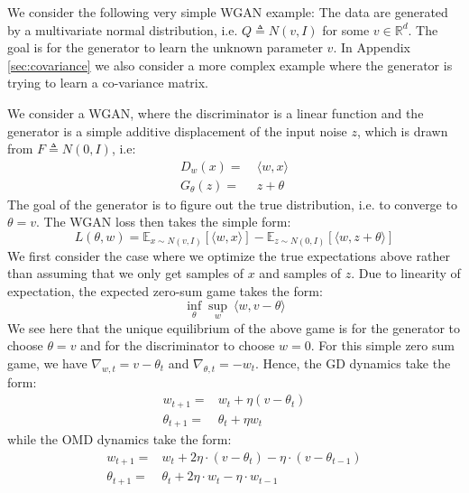 
We consider the following very simple WGAN example: The data are generated by a multivariate normal distribution, i.e. $Q \triangleq N(v, I)$ for some $v\in \mathbb{R}^d$. The goal is for the generator to learn the unknown parameter $v$. In  Appendix \ref{sec:covariance} we also consider a more complex example where the generator is trying to learn a co-variance matrix. 

We consider a WGAN, where the discriminator is a linear function and the generator is a simple additive displacement of the input noise $z$, which is drawn from $F\triangleq N(0, I)$, i.e:
\begin{equation}
\begin{aligned}
D_w(x) =~& \langle w, x\rangle\\
G_{\theta}(z) =~& z + \theta
\end{aligned}
\end{equation}
The goal of the generator is to figure out the true distribution, i.e. to converge to $\theta = v$. The WGAN loss then takes the simple form:
\begin{equation}
L(\theta, w) =  \mathbb{E}_{x\sim N(v, I)}\left[ \langle w, x \rangle \right] - \mathbb{E}_{z\sim N(0,I)}\left[\langle w, z + \theta \rangle\right] 
\end{equation}
We first consider the case where we optimize the true expectations above rather than assuming that we only get samples of $x$ and samples of $z$. Due to linearity of expectation, the expected zero-sum game takes the form:
\begin{equation}
\inf_{\theta} \sup_{w}~\langle w, v-\theta \rangle
\end{equation}
We see here that the unique equilibrium of the above game is for the generator to choose $\theta=v$ and for the discriminator to choose $w = 0$. For this simple zero sum game, we have $\nabla_{w, t}=v-\theta_t$ and $\nabla_{\theta, t}=-w_t$. Hence, the GD dynamics take the form:
\begin{equation}
\begin{aligned}
w_{t+1} =& w_{t} + \eta (v - \theta_{t})\\
\theta_{t+1} =& \theta_{t} + \eta w_t  
\end{aligned}\tag{GD Dynamics for Learning Means}
\end{equation}
while the OMD dynamics take the form:
\begin{equation}
\begin{aligned}
w_{t+1} =& w_{t} + 2\eta\cdot (v - \theta_{t}) - \eta \cdot (v-\theta_{t-1})\\
\theta_{t+1} =& \theta_{t} + 2\eta\cdot w_t - \eta\cdot  w_{t-1} 
\end{aligned}\tag{OMD Dynamics for Learning Means}
\end{equation}

